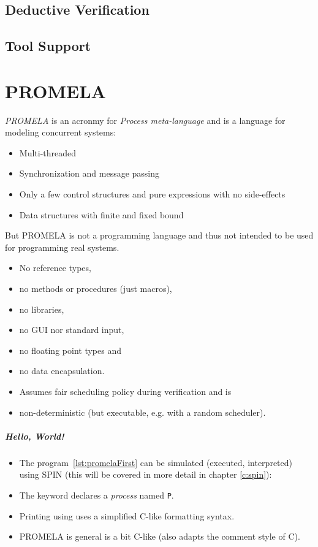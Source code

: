 	\section{Deductive Verification} %

	\section{Tool Support} %

\chapter{PROMELA}
	\textit{PROMELA} is an acronmy for \textit{Process meta-language} and is a language for modeling concurrent systems:
	\begin{itemize}
		\item Multi-threaded
		\item Synchronization and message passing
		\item Only a few control structures and pure expressions with no side-effects
		\item Data structures with finite and fixed bound
	\end{itemize}
	But PROMELA is not a programming language and thus not intended to be used for programming real systems.
	\begin{itemize}
		\item No reference types,
		\item no methods or procedures (just macros),
		\item no libraries,
		\item no GUI nor standard input,
		\item no floating point types and
		\item no data encapsulation.
		\item Assumes fair scheduling policy during verification and is
		\item non-deterministic (but executable, e.g. with a random scheduler).
	\end{itemize}

	\paragraph{Hello, World!}
		

		\begin{itemize}
			\item The program~\ref{lst:promelaFirst} can be simulated (executed, interpreted) using SPIN (this will be covered in more detail in chapter \ref{c:spin}):
			\item The keyword  declares a \textit{process} named \texttt{P}.
			\item Printing using  uses a simplified C-like formatting syntax.
			\item PROMELA is general is a bit C-like (also adapts the comment style of C).
		\end{itemize}

